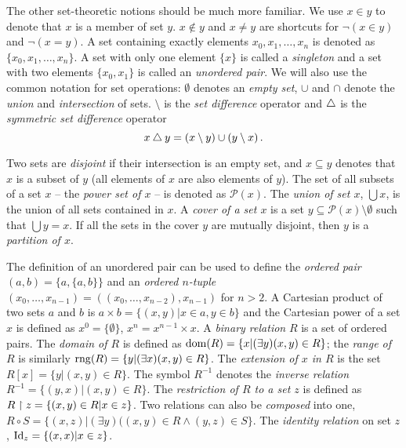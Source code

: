 
The other set-theoretic notions should be much more familiar. We use $x \in y$ to denote that $x$ is a member of set $y$. $x \notin y$ and $x \neq y$ are shortcuts for $\neg (x \in y)$ and $\neg (x = y)$. A set containing exactly elements $x_0, x_1, \dots, x_n$ is denoted as $\{x_0, x_1, \dots, x_n\}$. A set with only one element $\{x\}$ is called a \emph{singleton} and a set with two elements $\{x_0, x_1\}$ is called an \emph{unordered pair}. We will also use the common notation for set operations: $\emptyset$ denotes an \emph{empty set}, $\cup$ and $\cap$ denote the \emph{union} and \emph{intersection} of sets. $\setminus$ is the \emph{set difference} operator and $\bigtriangleup$ is the \emph{symmetric set difference} operator $$x \bigtriangleup y = (x \setminus y) \cup (y \setminus x)\,.$$

Two sets are \emph{disjoint} if their intersection is an empty set, and $x \subseteq y$ denotes that $x$ is a subset of $y$ (all elements of $x$ are also elements of $y$). The set of all subsets of a set $x$ -- the \emph{power set of $x$} -- is denoted as $\mathcal{P}(x)$. The \emph{union of set $x$}, $\bigcup x$, is the union of all sets contained in $x$. A \emph{cover of a set $x$} is a set $y \subseteq \mathcal{P}(x) \setminus \emptyset$ such that $\bigcup y = x$. If all the sets in the cover $y$ are mutually disjoint, then $y$ is a \emph{partition of $x$}.

The definition of an unordered pair can be used to define the \emph{ordered pair} $(a, b) = \{a, \{a,b\}\}$ and an \emph{ordered $n$-tuple} $(x_0, \dots, x_{n-1}) = ((x_0, \dots, x_{n-2}), x_{n-1})$ for $n > 2$. A Cartesian product of two sets $a$ and $b$ is $a \times b = \{(x,y) | x \in a, y \in b\}$ and the Cartesian power of a set $x$ is defined as $x^0 = \{\emptyset\}$, $x^n = x^{n-1} \times x$. A \emph{binary relation} $R$ is a set of ordered pairs. The \emph{domain of $R$} is defined as $\operatorname{dom}(R) = \{x|(\exists y)(x,y)\in R\}$; the \emph{range of $R$} is similarly $\operatorname{rng}(R) = \{y|(\exists x)(x,y)\in R\}$. The \emph{extension of $x$ in $R$} is the set $R[x] = \{y|(x,y)\in R\}$. The symbol $R^{-1}$ denotes the \emph{inverse relation} $R^{-1}=\{(y,x)|(x,y)\in R\}$. The \emph{restriction of $R$ to a set $z$} is defined as $R \upharpoonright z = \{(x,y) \in R|x \in z\}$. Two relations can also be \emph{composed} into one, $R \circ S = \{(x,z)|(\exists y)((x,y) \in R \land (y,z) \in S\}$. The \emph{identity relation} on set $z$, $\mathrm{Id}_z = \{(x,x)|x\in z\}$. 

